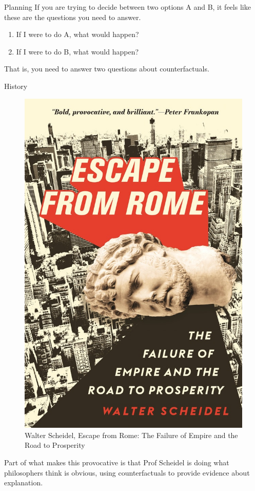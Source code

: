 \documentclass[
  ignorenonframetext,
]{beamer}
\providecommand{\tightlist}{%
  \setlength{\itemsep}{0pt}\setlength{\parskip}{0pt}}
\renewcommand{\,}{\text{, }}
\begin{document}
\begin{frame}{Planning}
\protect\hypertarget{planning}{}
If you are trying to decide between two options A and B, it feels like
these are the questions you need to answer.

\begin{enumerate}
\tightlist
\item
  If I were to do A, what would happen?
\item
  If I were to do B, what would happen?
\end{enumerate}

That is, you need to answer two questions about counterfactuals.
\end{frame}

\begin{frame}{History}
\protect\hypertarget{history}{}
\begin{figure}
\centering
\includegraphics[width=\textwidth,height=0.7\textheight]{../images/Scheidel.jpg}
\caption{Walter Scheidel, Escape from Rome: The Failure of Empire and
the Road to Prosperity}
\end{figure}

Part of what makes this provocative is that Prof Scheidel is doing what
philosophers think is obvious, using counterfactuals to provide evidence
about explanation.
\end{frame}
\end{document}
